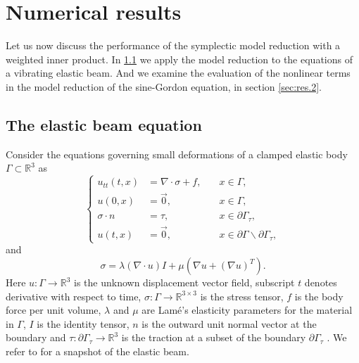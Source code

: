 \section{Numerical results} \label{sec:res}
Let us now discuss the performance of the symplectic model reduction with a weighted inner product. In \cref{sec:res.1} we apply the model reduction to the equations of a vibrating elastic beam. And we examine the evaluation of the nonlinear terms in the model reduction of the sine-Gordon equation, in section \cref{sec:res.2}.

\subsection{The elastic beam equation} \label{sec:res.1}
Consider the equations governing small deformations of a clamped elastic body $\Gamma\subset \mathbb R^{3}$ as 
\begin{equation} \label{eq:res.1}
\left\{
\begin{aligned}
	u_{tt}(t,x) &= \nabla \cdot \sigma + f, \quad & x\in \Gamma, \\
	u(0,x) &= \vec 0, & x\in \Gamma,\\
	\sigma \cdot n &= \tau, & x \in \partial \Gamma_\tau,\\
	u(t,x) &= \vec 0, & x \in\partial \Gamma \backslash \partial \Gamma_\tau,
\end{aligned}
\right.
\end{equation}
and
\begin{equation}  \label{eq:res.2}
	\sigma = \lambda (\nabla \cdot u) I + \mu(\nabla u + (\nabla u)^T).
\end{equation}
Here $u:\Gamma \to \mathbb{R}^3$ is the unknown displacement vector field, subscript $t$ denotes derivative with respect to time, $\sigma:\Gamma \to \mathbb{R}^{3\times 3}$ is the stress tensor, $f$ is the body force per unit volume, $\lambda$ and $\mu$ are Lam\'e's elasticity parameters for the material in $\Gamma$, $I$ is the identity tensor, $n$ is the outward unit normal vector at the boundary and $\tau:\partial \Gamma_\tau \to \mathbb R^3$ is the traction at a subset of the boundary $\partial \Gamma_\tau$ \cite{langtangen2017solving}. We refer to  for a snapshot of the elastic beam.


